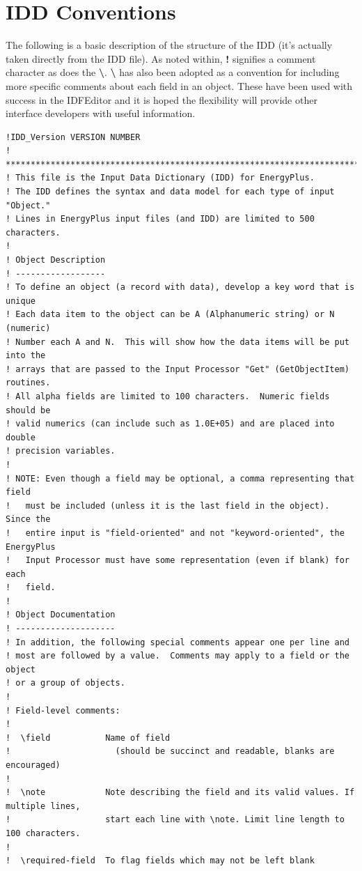 \section{IDD Conventions}\label{idd-conventions}

The following is a basic description of the structure of the IDD (it's actually taken directly from the IDD file). As noted within, \textbf{!} signifies a comment character as does the \textbf{\textbackslash{}}. \textbf{\textbackslash{}} has also been adopted as a convention for including more specific comments about each field in an object. These have been used with success in the IDFEditor and it is hoped the flexibility will provide other interface developers with useful information.

\begin{lstlisting}
!IDD_Version VERSION NUMBER
! **************************************************************************
! This file is the Input Data Dictionary (IDD) for EnergyPlus.
! The IDD defines the syntax and data model for each type of input "Object."
! Lines in EnergyPlus input files (and IDD) are limited to 500 characters.
!
! Object Description
! ------------------
! To define an object (a record with data), develop a key word that is unique
! Each data item to the object can be A (Alphanumeric string) or N (numeric)
! Number each A and N.  This will show how the data items will be put into the
! arrays that are passed to the Input Processor "Get" (GetObjectItem) routines.
! All alpha fields are limited to 100 characters.  Numeric fields should be
! valid numerics (can include such as 1.0E+05) and are placed into double
! precision variables.
!
! NOTE: Even though a field may be optional, a comma representing that field
!   must be included (unless it is the last field in the object).  Since the
!   entire input is "field-oriented" and not "keyword-oriented", the EnergyPlus
!   Input Processor must have some representation (even if blank) for each
!   field.
!
! Object Documentation
! --------------------
! In addition, the following special comments appear one per line and
! most are followed by a value.  Comments may apply to a field or the object
! or a group of objects.
!
! Field-level comments:
!
!  \field           Name of field
!                     (should be succinct and readable, blanks are encouraged)
!
!  \note            Note describing the field and its valid values. If multiple lines,
!                   start each line with \note. Limit line length to 100 characters.
!
!  \required-field  To flag fields which may not be left blank

\end{lstlisting}
